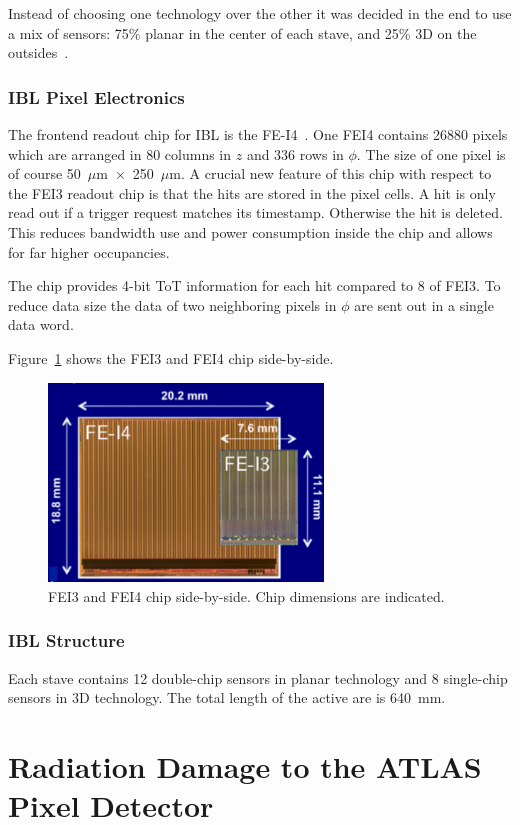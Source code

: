 Instead of choosing one technology over the other it was decided in the end to use a mix of sensors: 75\% planar in the center of each stave, and 25\% 3D on the outsides~\cite{AtlasVertexing2012}.


\subsubsection{IBL Pixel Electronics}

The frontend readout chip for IBL is the FE-I4~\cite{FEI4}. One FEI4 contains 26880 pixels which are arranged in 80 columns in $z$ and 336 rows in $\phi$. The size of one pixel is of course 
50~$\mu$m~$\times$~250~$\mu$m.
A crucial new feature of this chip with respect to the FEI3 readout chip is that the hits are stored in the 
pixel cells. A hit is only read out if a trigger request matches its timestamp. Otherwise the hit is deleted. 
This reduces bandwidth use and power consumption inside the chip and allows for far higher 
occupancies.

The chip provides 4-bit ToT information for each hit compared to 8 of FEI3. To reduce data size the data of two neighboring pixels in $\phi$ are sent out in a single data word.

Figure~\ref{fig:TwoFEIs} shows the FEI3 and FEI4 chip side-by-side.
\begin{figure}[!htpb]
\centering
\includegraphics[width=0.65\textwidth]{TwoFEIs.pdf}
\caption{\label{fig:TwoFEIs}FEI3 and FEI4 chip side-by-side. Chip dimensions are indicated.}
\end{figure}

\subsubsection{IBL Structure}
Each stave contains 12 double-chip sensors in planar technology and 8 single-chip sensors in 3D technology. The total length of the active are is 640~mm.


\section{Radiation Damage to the ATLAS Pixel Detector}
\label{sec:digitizer}

